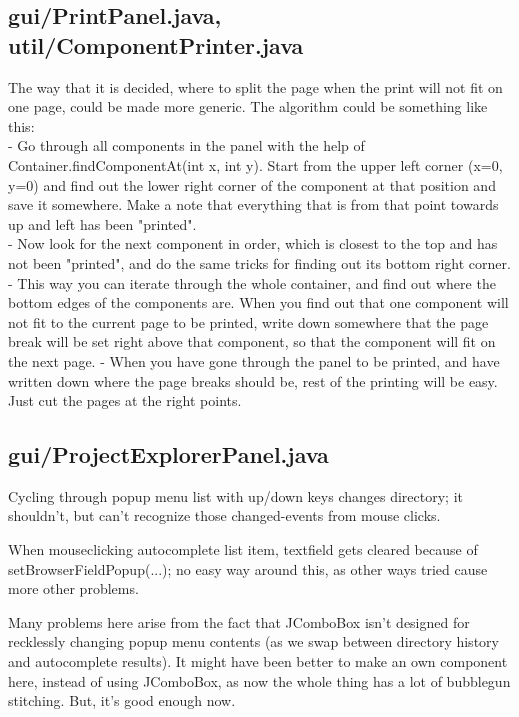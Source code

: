 \subsection{gui/PrintPanel.java, util/ComponentPrinter.java}

The way that it is decided, where to split the page when the print will not fit on one page, could be made more generic. The algorithm could be something like this: \\
- Go through all components in the panel with the help of Container.findComponentAt(int x, int y). Start from the upper left corner (x=0, y=0) and find out the lower right corner of the component at that position and save it somewhere. Make a note that everything that is from that point towards up and left has been "printed". \\
- Now look for the next component in order, which is closest to the top and has not been "printed", and do the same tricks for finding out its bottom right corner. \\
- This way you can iterate through the whole container, and find out where the bottom edges of the components are. When you find out that one component will not fit to the current page to be printed, write down somewhere that the page break will be set right above that component, so that the component will fit on the next page.
- When you have gone through the panel to be printed, and have written down where the page breaks should be, rest of the printing will be easy. Just cut the pages at the right points.


\subsection{gui/ProjectExplorerPanel.java}

Cycling through popup menu list with up/down keys changes directory; it shouldn't, but can't recognize those changed-events from mouse clicks.

When mouseclicking autocomplete list item, textfield gets cleared because of setBrowserFieldPopup(...); no easy way around this, as other ways tried cause more other problems.

Many problems here arise from the fact that JComboBox isn't designed for recklessly changing popup menu contents (as we swap between directory history and autocomplete results). It might have been better to make an own component here, instead of using JComboBox, as now the whole thing has a lot of bubblegun stitching. But, it's good enough now.


